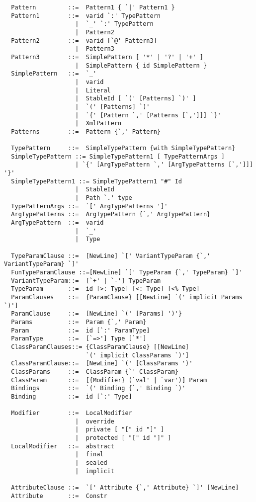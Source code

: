 \begin{lstlisting}
  Pattern         ::=  Pattern1 { `|' Pattern1 }
  Pattern1        ::=  varid `:' TypePattern
                    |  `_' `:' TypePattern
                    |  Pattern2
  Pattern2        ::=  varid [`@' Pattern3]
                    |  Pattern3
  Pattern3        ::=  SimplePattern [ '*' | '?' | '+' ]
                    |  SimplePattern { id SimplePattern }
  SimplePattern   ::=  `_'
                    |  varid
                    |  Literal
                    |  StableId [ `(' [Patterns] `)' ]
                    |  `(' [Patterns] `)'
                    |  `{' [Pattern `,' [Patterns [`,']]] `}'
                    |  XmlPattern
  Patterns        ::=  Pattern {`,' Pattern}

  TypePattern     ::=  SimpleTypePattern {with SimpleTypePattern}
  SimpleTypePattern ::= SimpleTypePattern1 [ TypePatternArgs ]
                    | `{' [ArgTypePattern `,' [ArgTypePatterns [`,']]] '}'
  SimpleTypePattern1 ::= SimpleTypePattern1 "#" Id
                    |  StableId 
                    |  Path `.' type 
  TypePatternArgs ::=  `[' ArgTypePatterns ']'
  ArgTypePatterns ::=  ArgTypePattern {`,' ArgTypePattern}
  ArgTypePattern  ::=  varid 
                    |  `_' 
                    |  Type

  TypeParamClause ::=  [NewLine] `[' VariantTypeParam {`,' VariantTypeParam} `]'
  FunTypeParamClause ::=[NewLine] `[' TypeParam {`,' TypeParam} `]'
  VariantTypeParam::=  [`+' | `-'] TypeParam
  TypeParam       ::=  id [>: Type] [<: Type] [<% Type]
  ParamClauses    ::=  {ParamClause} [[NewLine] `(' implicit Params `)']
  ParamClause     ::=  [NewLine] `(' [Params] ')'} 
  Params          ::=  Param {`,' Param}
  Param           ::=  id [`:' ParamType]
  ParamType       ::=  [`=>'] Type [`*']
  ClassParamClauses::= {ClassParamClause} [[NewLine] 
                       `(' implicit ClassParams `)']
  ClassParamClause::=  [NewLine] `(' [ClassParams ')'
  ClassParams     ::=  ClassParam {`' ClassParam}
  ClassParam      ::=  [{Modifier} (`val' | `var')] Param
  Bindings        ::=  `(' Binding {`,' Binding `)'
  Binding         ::=  id [`:' Type]

  Modifier        ::=  LocalModifier 
                    |  override
                    |  private [ "[" id "]" ] 
                    |  protected [ "[" id "]" ] 
  LocalModifier   ::=  abstract
                    |  final
                    |  sealed
                    |  implicit

  AttributeClause ::=  `[' Attribute {`,' Attribute} `]' [NewLine]
  Attribute       ::=  Constr


\end{lstlisting}
